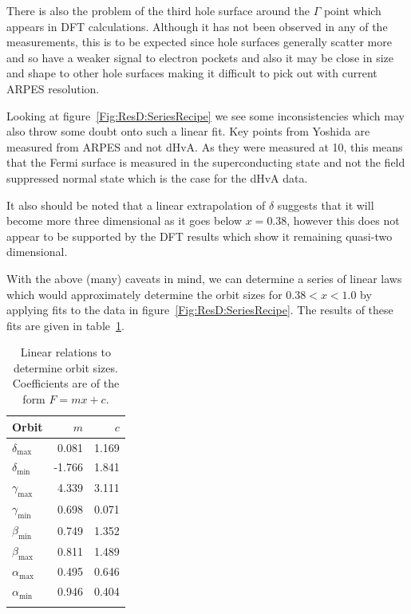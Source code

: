 There is also the problem of the third hole surface around the $\Gamma$ point which appears in \ac{DFT} calculations. Although it has not been observed in any of the measurements, this is to be expected since hole surfaces generally scatter more and so have a weaker signal to electron pockets and also it may be close in size and shape to other hole surfaces making it difficult to pick out with current \ac{ARPES} resolution.

Looking at figure~\ref{Fig:ResD:SeriesRecipe} we see some inconsistencies which may also throw some doubt onto such a linear fit. Key points from Yoshida \etal are measured from \ac{ARPES} and not \ac{dHvA}. As they were measured at \unit{10}{\kelvin}, this means that the Fermi surface is measured in the superconducting state and not the field suppressed normal state which is the case for the \ac{dHvA} data. 

 It also should be noted that a linear extrapolation of $\delta$ suggests that it will become more three dimensional as it goes below $x=0.38$, however this does not appear to be supported by the \ac{DFT} results which show it remaining quasi-two dimensional. 

With the above (many) caveats in mind, we can determine a series of linear laws which would approximately determine the orbit sizes for $0.38 < x < 1.0$ by applying fits to the data in figure~\ref{Fig:ResD:SeriesRecipe}. The results of these fits are given in table~\ref{Table:ResD:SeriesRecipeFits}.
\begin{table}
    \begin{center}
           \caption{Linear relations to determine orbit sizes. Coefficients are of the form $F=mx+c$.}
        \begin{tabular}[htbp]{lrr}
\toprule
Orbit   & $m$   & $c$   \\
\midrule
$\delta_{\textrm{max}}$ & 0.081 & 1.169 \\
$\delta_{\textrm{min}}$ & -1.766 & 1.841 \\
$\gamma_{\textrm{max}}$ & 4.339 & 3.111 \\
$\gamma_{\textrm{min}}$ & 0.698 &  0.071 \\
$\beta_{\textrm{min}}$ & 0.749 & 1.352 \\
$\beta_{\textrm{max}}$ & 0.811 & 1.489 \\
$\alpha_{\textrm{max}}$ & 0.495 & 0.646 \\
$\alpha_{\textrm{min}}$ & 0.946 & 0.404 \\
\bottomrule
        \label{Table:ResD:SeriesRecipeFits}
        \end{tabular}
    \end{center}
\end{table}

